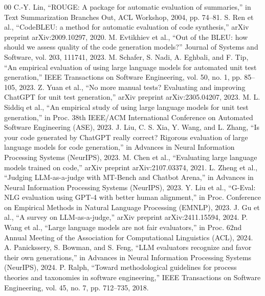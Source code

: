 \documentclass[conference]{IEEEtran}
\begin{document}
\begin{thebibliography}{00}
 C.-Y. Lin, ``ROUGE: A package for automatic evaluation of summaries,'' in Text Summarization Branches Out, ACL Workshop, 2004, pp. 74--81.
 S. Ren et al., ``CodeBLEU: a method for automatic evaluation of code synthesis,'' arXiv preprint arXiv:2009.10297, 2020.
 M. Evtikhiev et al., ``Out of the BLEU: how should we assess quality of the code generation models?'' Journal of Systems and Software, vol. 203, 111741, 2023.
 M. Schafer, S. Nadi, A. Eghbali, and F. Tip, ``An empirical evaluation of using large language models for automated unit test generation,'' IEEE Transactions on Software Engineering, vol. 50, no. 1, pp. 85--105, 2023.
 Z. Yuan et al., ``No more manual tests? Evaluating and improving ChatGPT for unit test generation,'' arXiv preprint arXiv:2305.04207, 2023.
 M. L. Siddiq et al., ``An empirical study of using large language models for unit test generation,'' in Proc. 38th IEEE/ACM International Conference on Automated Software Engineering (ASE), 2023.
 J. Liu, C. S. Xia, Y. Wang, and L. Zhang, ``Is your code generated by ChatGPT really correct? Rigorous evaluation of large language models for code generation,'' in Advances in Neural Information Processing Systems (NeurIPS), 2023.
 M. Chen et al., ``Evaluating large language models trained on code,'' arXiv preprint arXiv:2107.03374, 2021.
 L. Zheng et al., ``Judging LLM-as-a-judge with MT-Bench and Chatbot Arena,'' in Advances in Neural Information Processing Systems (NeurIPS), 2023.
 Y. Liu et al., ``G-Eval: NLG evaluation using GPT-4 with better human alignment,'' in Proc. Conference on Empirical Methods in Natural Language Processing (EMNLP), 2023.
 J. Gu et al., ``A survey on LLM-as-a-judge,'' arXiv preprint arXiv:2411.15594, 2024.
 P. Wang et al., ``Large language models are not fair evaluators,'' in Proc. 62nd Annual Meeting of the Association for Computational Linguistics (ACL), 2024.
 A. Panickssery, S. Bowman, and S. Feng, ``LLM evaluators recognize and favor their own generations,'' in Advances in Neural Information Processing Systems (NeurIPS), 2024.
 P. Ralph, ``Toward methodological guidelines for process theories and taxonomies in software engineering,'' IEEE Transactions on Software Engineering, vol. 45, no. 7, pp. 712--735, 2018.

\end{thebibliography}
\end{document}
